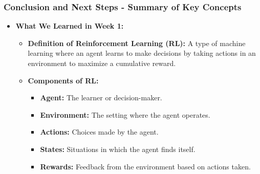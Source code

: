 \documentclass[aspectratio=169]{beamer}
\begin{document}
\begin{frame}[fragile]
    \frametitle{Conclusion and Next Steps - Summary of Key Concepts}
    
    \begin{itemize}
        \item \textbf{What We Learned in Week 1:}
        \begin{itemize}
            \item \textbf{Definition of Reinforcement Learning (RL):} 
            A type of machine learning where an agent learns to make decisions by taking actions in an environment to maximize a cumulative reward.
            \item \textbf{Components of RL:}
            \begin{itemize}
                \item \textbf{Agent:} The learner or decision-maker.
                \item \textbf{Environment:} The setting where the agent operates.
                \item \textbf{Actions:} Choices made by the agent.
                \item \textbf{States:} Situations in which the agent finds itself.
                \item \textbf{Rewards:} Feedback from the environment based on actions taken.
            \end{itemize}
        \end{itemize}
    \end{itemize}
\end{frame}
\end{document}
